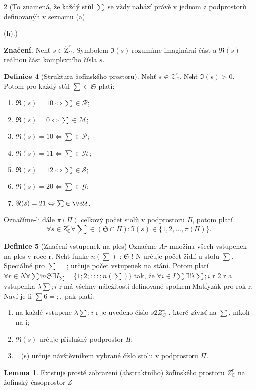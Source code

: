 \documentclass[12pt,a4paper]{article}
\begin{document}
2
(To znamená, že každý stùl $\sum$ se vždy nahází právě v jednom z podprostorù definovanýh
v seznamu (a){(h).)


\textbf{Značení.}
Nehť $s \in Ž^r_C$. Symbolem $\Im(s)$ rozumíme imaginární část a $\Re(s)$ reálnou část
komplexního čísla $s$.


\textbf{Definice 4}
(Struktura žofínského prostoru).
Nehť $s \in \mathcal{Z}^r_C$. Nehť $\Im(s) > 0$. Potom pro
každý stùl $\sum \in \mathfrak{S}$ platí:
\begin{enumerate}
\item $\Re(s) = 10 \Leftrightarrow \sum \in \mathcal{R}$;
\item $\Re(s) = 0 \Leftrightarrow \sum \in \mathcal{M}$;
\item $\Re(s) = 10 \Leftrightarrow \sum \in \mathcal{P}$;
\item $\Re(s) = 11 \Leftrightarrow \sum \in \mathcal{H}$;
\item $\Re(s) = 12 \Leftrightarrow \sum \in \mathcal{S}$;
\item $\Re(s) = 20 \Leftrightarrow \sum \in \mathcal{G}$;
\item $\Re(s) = 21 \Leftrightarrow \sum \ině \mathcal{U}$.
\end{enumerate}
Označíme-li dále $\pi(\Pi)$ celkový počet stolù v podprostoru $\Pi$, potom platí
$$
\forall s \in Z^r_{\mathds{C}} \forall \sum \in (\mathfrak{S} \cap \Pi) : \Im(s) \in \{1, 2, ..., \pi(\Pi)\}.
$$


\textbf{Definice 5}
(Značení vstupenek na ples)
Označme $\Lambda r$ množinu všech vstupenek na ples
v roce r. Nehť funke $n(\sum)$ : $\mathfrak{S}$ ! N určuje počet židlí u stolu $\sum$. Speciálně pro $\sum$ = ;
určuje počet vstupenek na stání. Potom platí
$
\forall r \in N \forall \sum ïn \mathfrak{S} \exists I_{\sum} = \{1; 2; : : : ; n(\sum)\}
$
tak, že 
$
\forall i \in I \sum \exists! \lambda\sum;i
$
r 2 r
a vstupenka $\lambda\sum;i$
r má všehny náležitosti definované spolkem Matfyzák pro rok r. Naví
je-li $\sum 6= ;,$ pak platí:
\begin{enumerate}
\item na každé vstupene $\lambda\sum;i$
r
je uvedeno číslo $s 2 Z^r_C$
, které závisí na $\sum$, nikoli na i;
\item $\Re(s)$ určuje příslušný podprostor $\Pi$;
\item =(s) určuje návštěvníkem vybrané číslo stolu v podprostoru $\Pi$.
\end{enumerate}


\textbf{Lemma 1}. Existuje prosté zobrazení (abstraktního) žofínského prostoru
$Z^r_{\mathds{C}}$ na žofínský
časoprostor $Z$

}
\end{document}
